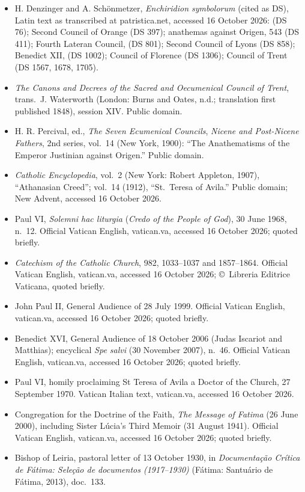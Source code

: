 {\fontsize{8.6}{9.6}\selectfont
\begin{itemize}[itemsep=0pt,parsep=0pt,topsep=0.05em]
\item H. Denzinger and A. Schönmetzer, \emph{Enchiridion symbolorum} (cited as DS), Latin text as transcribed at patristica.net, accessed 16 October 2026:  (DS 76); Second Council of Orange (DS 397); anathemas against Origen, 543 (DS 411); Fourth Lateran Council,  (DS 801); Second Council of Lyons (DS 858); Benedict XII,  (DS 1002); Council of Florence (DS 1306); Council of Trent (DS 1567, 1678, 1705).
\item \emph{The Canons and Decrees of the Sacred and Oecumenical Council of Trent}, trans.\ J. Waterworth (London: Burns and Oates, n.d.; translation first published 1848), session XIV. Public domain.
\item H. R. Percival, ed., \emph{The Seven Ecumenical Councils}, \emph{Nicene and Post-Nicene Fathers}, 2nd series, vol.~14 (New York, 1900): ``The Anathematisms of the Emperor Justinian against Origen.'' Public domain.
\item \emph{Catholic Encyclopedia}, vol.~2 (New York: Robert Appleton, 1907), ``Athanasian Creed''; vol.~14 (1912), ``St.\ Teresa of Avila.'' Public domain; New Advent, accessed 16 October 2026.
\item Paul VI, \emph{Solemni hac liturgia} (\emph{Credo of the People of God}), 30 June 1968, n.~12. Official Vatican English, vatican.va, accessed 16 October 2026; quoted briefly.
\item \emph{Catechism of the Catholic Church}, 982, 1033--1037 and 1857--1864. Official Vatican English, vatican.va, accessed 16 October 2026; \copyright\ Libreria Editrice Vaticana, quoted briefly.
\item John Paul II, General Audience of 28 July 1999. Official Vatican English, vatican.va, accessed 16 October 2026; quoted briefly.
\item Benedict XVI, General Audience of 18 October 2006 (Judas Iscariot and Matthias); encyclical \emph{Spe salvi} (30 November 2007), n.~46. Official Vatican English, vatican.va, accessed 16 October 2026; quoted briefly.
\item Paul VI, homily proclaiming St Teresa of Avila a Doctor of the Church, 27 September 1970. Vatican Italian text, vatican.va, accessed 16 October 2026.
\item Congregation for the Doctrine of the Faith, \emph{The Message of Fatima} (26 June 2000), including Sister Lúcia's Third Memoir (31 August 1941). Official Vatican English, vatican.va, accessed 16 October 2026; quoted briefly.
\item Bishop of Leiria, pastoral letter of 13 October 1930, in \emph{Documentação Crítica de Fátima: Seleção de documentos (1917--1930)} (Fátima: Santuário de Fátima, 2013), doc.~133.
\end{itemize}}

